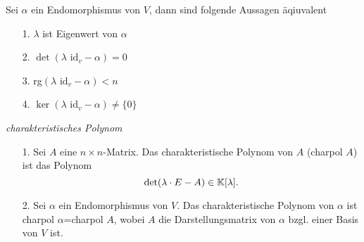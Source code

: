 \begin{mysatz} \qquad \par
    Sei $\alpha$ ein Endomorphismus von $V$, dann sind folgende Aussagen äqiuvalent
    \begin{itemize}
        \item [1.] $\lambda$ ist Eigenwert von $\alpha$
        \item [2.] $\det(\lambda \mbox{ id}_v-\alpha)=0$
        \item [3.] rg$(\lambda \mbox{ id}_v-\alpha)<n$
        \item [4.] $\ker(\lambda \mbox{ id}_v-\alpha) \neq \lbrace 0 \rbrace$
    \end{itemize}
\end{mysatz}


\begin{mydef}\label{charpol} \textit{charakteristisches Polynom} \par
    \begin{itemize}
        \item[ 1.]Sei $A$ eine $n\times n$-Matrix. Das charakteristische Polynom von $A$ (charpol $A$) ist das Polynom 
            \begin{equation*}
                \det(\lambda\cdot E-A)\in \mathbb{K}[\lambda].
            \end{equation*}
        \item[ 2.]Sei $\alpha$ ein Endomorphismus von $V$. Das charakteristische Polynom von $\alpha$ ist charpol $\alpha$=charpol $A$, wobei $A$ die 
            Darstellungsmatrix von $\alpha$ bzgl. einer Basis von $V$ ist.
    \end{itemize}
\end{mydef}

